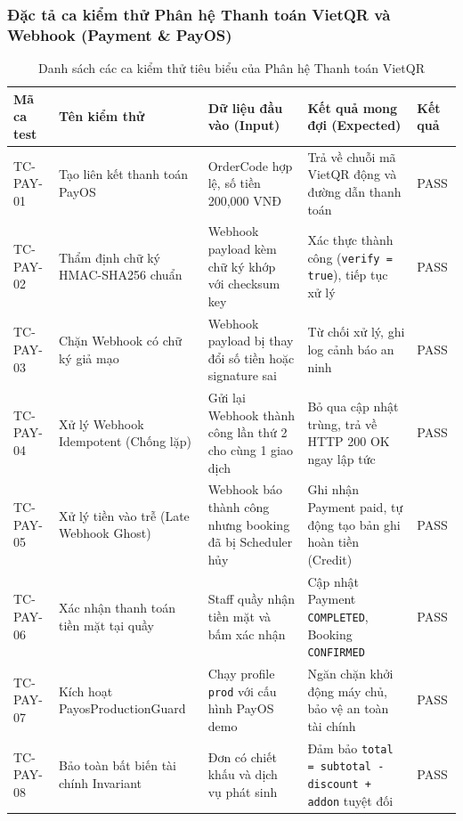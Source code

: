 \subsubsection{Đặc tả ca kiểm thử Phân hệ Thanh toán VietQR và Webhook (Payment \& PayOS)}

\begin{table}[H]
\centering
\caption{Danh sách các ca kiểm thử tiêu biểu của Phân hệ Thanh toán VietQR}
\label{tab:tc-payment}
\renewcommand{\arraystretch}{1.25}
\begin{tabular}{|p{2.2cm}|p{3.5cm}|p{3.5cm}|p{4.2cm}|p{1.2cm}|}
\hline
\textbf{Mã ca test} & \textbf{Tên kiểm thử} & \textbf{Dữ liệu đầu vào (Input)} & \textbf{Kết quả mong đợi (Expected)} & \textbf{Kết quả} \\
\hline
TC-PAY-01 & Tạo liên kết thanh toán PayOS & OrderCode hợp lệ, số tiền 200,000 VNĐ & Trả về chuỗi mã VietQR động và đường dẫn thanh toán & PASS \\
\hline
TC-PAY-02 & Thẩm định chữ ký HMAC-SHA256 chuẩn & Webhook payload kèm chữ ký khớp với checksum key & Xác thực thành công (\texttt{verify = true}), tiếp tục xử lý & PASS \\
\hline
TC-PAY-03 & Chặn Webhook có chữ ký giả mạo & Webhook payload bị thay đổi số tiền hoặc signature sai & Từ chối xử lý, ghi log cảnh báo an ninh & PASS \\
\hline
TC-PAY-04 & Xử lý Webhook Idempotent (Chống lặp) & Gửi lại Webhook thành công lần thứ 2 cho cùng 1 giao dịch & Bỏ qua cập nhật trùng, trả về HTTP 200 OK ngay lập tức & PASS \\
\hline
TC-PAY-05 & Xử lý tiền vào trễ (Late Webhook Ghost) & Webhook báo thành công nhưng booking đã bị Scheduler hủy & Ghi nhận Payment paid, tự động tạo bản ghi hoàn tiền (Credit) & PASS \\
\hline
TC-PAY-06 & Xác nhận thanh toán tiền mặt tại quầy & Staff quầy nhận tiền mặt và bấm xác nhận & Cập nhật Payment \texttt{COMPLETED}, Booking \texttt{CONFIRMED} & PASS \\
\hline
TC-PAY-07 & Kích hoạt PayosProductionGuard & Chạy profile \texttt{prod} với cấu hình PayOS demo & Ngăn chặn khởi động máy chủ, bảo vệ an toàn tài chính & PASS \\
\hline
TC-PAY-08 & Bảo toàn bất biến tài chính Invariant & Đơn có chiết khấu và dịch vụ phát sinh & Đảm bảo \texttt{total = subtotal - discount + addon} tuyệt đối & PASS \\
\hline
\end{tabular}
\end{table}

